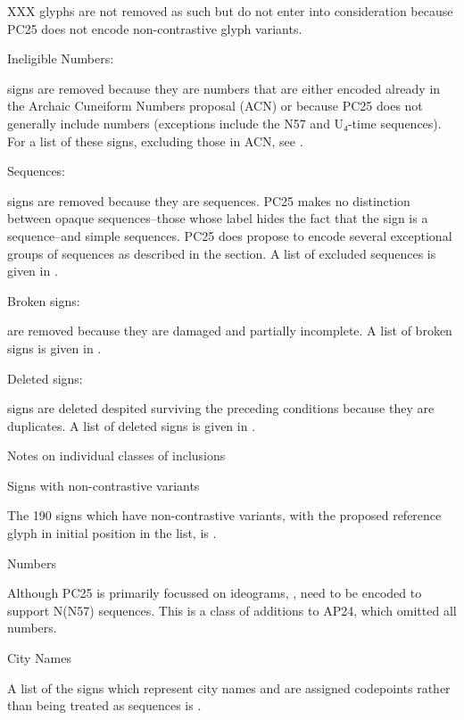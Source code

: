 	XXX glyphs are not removed as such but do not enter into
	consideration because PC25 does not encode non-contrastive
	glyph variants.

\Hli{}\bgroup\remfor{}Ineligible Numbers:\egroup{} 
	
	signs are removed because they are numbers that are either
	encoded already in the Archaic Cuneiform Numbers proposal
	(ACN) or because PC25 does not generally include numbers
	(exceptions include the N57 and U₄-time sequences). For a list
	of these signs, excluding those in ACN, see .

\Hli{}\bgroup\remfor{}Sequences:\egroup{} 
	
	signs are removed because they are sequences. PC25 makes no
	distinction between opaque sequences--those whose label hides
	the fact that the sign is a sequence--and simple sequences.
	PC25 does propose to encode several exceptional groups of
	sequences as described in the  section.  A
	list of excluded sequences is given in .

\Hli{}\bgroup\remfor{}Broken signs:\egroup{} 
	
	are removed because they are damaged and partially incomplete.
	A list of broken signs is given in .

\Hli{}\bgroup\remfor{}Deleted signs:\egroup{} 
	
	signs are deleted despited surviving the preceding conditions
	because they are duplicates.  A list of deleted signs is given
	in .

\Hendol
\Hhh{}Notes on individual classes of inclusions

\Hhhh{}Signs with non-contrastive variants


\par The 190 signs which have non-contrastive variants, with the
      proposed reference glyph in initial position in the list, is
      .

\Hhhh{}Numbers


\par Although PC25 is primarily focussed on ideograms, , need to be
      encoded to support N(N57) sequences.  This is a class of
      additions to AP24, which omitted all numbers.

\Hhhh{}City Names


\par A list of the signs which represent city names and are
      assigned codepoints rather than being treated as sequences is
      .

